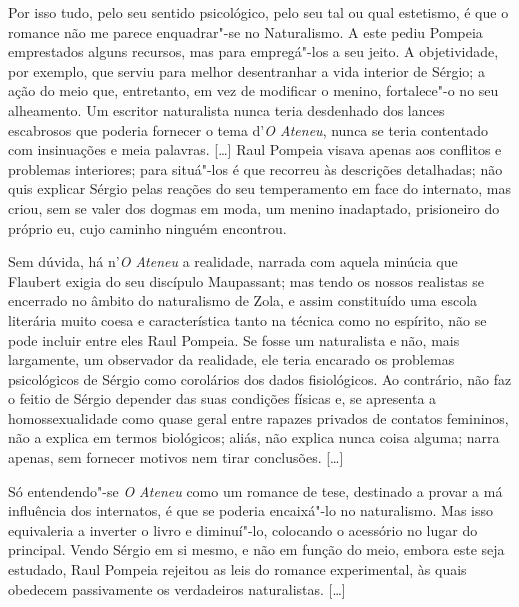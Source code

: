 

Por isso tudo, pelo seu sentido psicológico, pelo seu
tal ou qual estetismo, é que o romance não me parece enquadrar"-se no
Naturalismo. A este pediu Pompeia emprestados alguns recursos, mas para
empregá"-los a seu jeito. A objetividade, por exemplo, que serviu para
melhor desentranhar a vida interior de Sérgio; a ação do meio que,
entretanto, em vez de modificar o menino, fortalece"-o no seu
alheamento. Um escritor naturalista nunca teria desdenhado dos lances
escabrosos que poderia fornecer o tema d'\textit{O
Ateneu}, nunca se teria contentado com insinuações e
meia palavras. [\ldots] Raul Pompeia visava apenas aos conflitos e
problemas interiores; para situá"-los é que recorreu às descrições
detalhadas; não quis explicar Sérgio pelas reações do seu temperamento
em face do internato, mas criou, sem se valer dos dogmas em moda, um
menino inadaptado, prisioneiro do próprio eu, cujo caminho ninguém encontrou.

Sem dúvida, há n'\textit{O Ateneu} a realidade, narrada com aquela minúcia que
Flaubert exigia do seu discípulo Maupassant; mas tendo os nossos
realistas se encerrado no âmbito do naturalismo de Zola, e assim
constituído uma escola literária muito coesa e característica tanto na
técnica como no espírito, não se pode incluir entre eles Raul Pompeia.
Se fosse um naturalista e não, mais largamente, um observador da
realidade, ele teria encarado os problemas psicológicos de Sérgio como
corolários dos dados fisiológicos. Ao contrário, não faz o feitio de
Sérgio depender das suas condições físicas e, se apresenta a
homossexualidade como quase geral entre rapazes privados de contatos
femininos, não a explica em termos biológicos; aliás, não explica nunca
coisa alguma; narra apenas, sem fornecer motivos nem tirar conclusões.
[\ldots]

Só entendendo"-se \textit{O Ateneu} como um romance de tese, destinado a provar a
má influência dos internatos, é que se poderia encaixá"-lo no
naturalismo. Mas isso equivaleria a inverter o livro e diminuí"-lo,
colocando o acessório no lugar do principal. Vendo Sérgio em si mesmo,
e não em função do meio, embora este seja estudado, Raul Pompeia
rejeitou as leis do romance experimental, às quais obedecem
passivamente os verdadeiros naturalistas. [\ldots]

